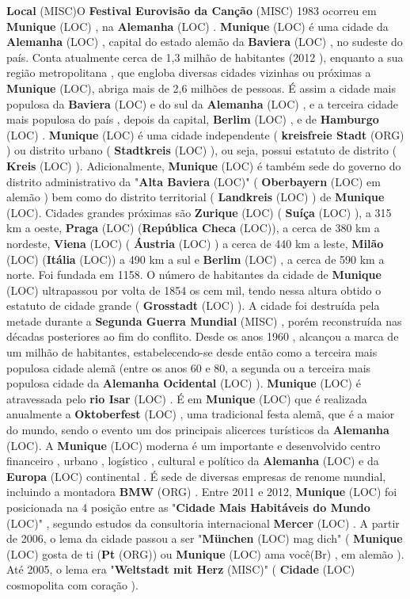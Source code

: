 \documentclass[12pt,a4paper]{article}
\begin{document}
\textbf{Local} (MISC)O \textbf{Festival Eurovisão da Canção} (MISC) 1983 ocorreu em \textbf{Munique} (LOC) , na \textbf{Alemanha} (LOC) . \textbf{Munique} (LOC) é uma cidade da \textbf{Alemanha} (LOC) , capital do estado alemão da \textbf{Baviera} (LOC) , no sudeste do país. Conta atualmente cerca de 1,3 milhão de habitantes (2012 ), enquanto a sua região metropolitana , que engloba diversas cidades vizinhas ou próximas a \textbf{Munique} (LOC), abriga mais de 2,6 milhões de pessoas. É assim a cidade mais populosa da \textbf{Baviera} (LOC) e do sul da \textbf{Alemanha} (LOC) , e a terceira cidade mais populosa do país , depois da capital, \textbf{Berlim} (LOC) , e de \textbf{Hamburgo} (LOC) . \textbf{Munique} (LOC) é uma cidade independente ( \textbf{kreisfreie Stadt} (ORG) ) ou distrito urbano ( \textbf{Stadtkreis} (LOC) ), ou seja, possui estatuto de distrito ( \textbf{Kreis} (LOC) ). Adicionalmente, \textbf{Munique} (LOC) é também sede do governo do distrito administrativo da "\textbf{Alta Baviera} (LOC)" ( \textbf{Oberbayern} (LOC) em alemão ) bem como do distrito territorial ( \textbf{Landkreis} (LOC) ) de \textbf{Munique} (LOC). Cidades grandes próximas são \textbf{Zurique} (LOC) ( \textbf{Suíça} (LOC) ), a 315 km a oeste, \textbf{Praga} (LOC) (\textbf{República Checa} (LOC)), a cerca de 380 km a nordeste, \textbf{Viena} (LOC) ( \textbf{Áustria} (LOC) ) a cerca de 440 km a leste, \textbf{Milão} (LOC) (\textbf{Itália} (LOC)) a 490 km a sul e \textbf{Berlim} (LOC) , a cerca de 590 km a norte. Foi fundada em 1158. O número de habitantes da cidade de \textbf{Munique} (LOC) ultrapassou por volta de 1854 os cem mil, tendo nessa altura obtido o estatuto de cidade grande ( \textbf{Grosstadt} (LOC) ). A cidade foi destruída pela metade durante a \textbf{Segunda Guerra Mundial} (MISC) , porém reconstruída nas décadas posteriores ao fim do conflito. Desde os anos 1960 , alcançou a marca de um milhão de habitantes, estabelecendo-se desde então como a terceira mais populosa cidade alemã (entre os anos 60 e 80, a segunda ou a terceira mais populosa cidade da \textbf{Alemanha Ocidental} (LOC) ). \textbf{Munique} (LOC) é atravessada pelo \textbf{rio Isar} (LOC) . É em \textbf{Munique} (LOC) que é realizada anualmente a \textbf{Oktoberfest} (LOC) , uma tradicional festa alemã, que é a maior do mundo, sendo o evento um dos principais alicerces turísticos da \textbf{Alemanha} (LOC). A \textbf{Munique} (LOC) moderna é um importante e desenvolvido centro financeiro , urbano , logístico , cultural e político da \textbf{Alemanha} (LOC) e da \textbf{Europa} (LOC) continental . É sede de diversas empresas de renome mundial, incluindo a montadora \textbf{BMW} (ORG) . Entre 2011 e 2012, \textbf{Munique} (LOC) foi posicionada na 4 posição entre as "\textbf{Cidade Mais Habitáveis do Mundo} (LOC)" , segundo estudos da consultoria internacional \textbf{Mercer} (LOC) . A partir de 2006, o lema da cidade passou a ser "\textbf{München} (LOC) mag dich" ( \textbf{Munique} (LOC) gosta de ti (\textbf{Pt} (ORG)) ou \textbf{Munique} (LOC) ama você(Br) , em alemão ). Até 2005, o lema era "\textbf{Weltstadt mit Herz} (MISC)" ( \textbf{Cidade} (LOC) cosmopolita com coração ).
\end{document}
